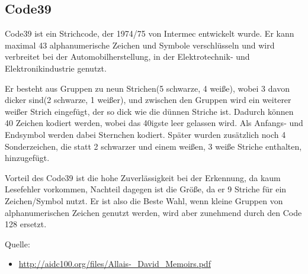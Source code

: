 \subsection*{Code39}
Code39 ist ein Strichcode, der 1974/75 von Intermec entwickelt wurde. Er kann maximal 43 alphanumerische Zeichen und Symbole verschlüsseln und wird verbreitet bei der Automobilherstellung, in der Elektrotechnik- und Elektronikindustrie genutzt.

Er besteht aus Gruppen zu neun Strichen(5 schwarze, 4 weiße), wobei 3 davon dicker sind(2 schwarze, 1 weißer), und zwischen den Gruppen wird ein weiterer weißer Strich eingefügt, der so dick wie die dünnen Striche ist. Dadurch können 40 Zeichen kodiert werden, wobei das 40igste leer gelassen wird. Als Anfangs- und Endsymbol werden dabei Sternchen kodiert. Später wurden zusätzlich noch 4 Sonderzeichen, die statt 2 schwarzer und einem weißen, 3 weiße Striche enthalten, hinzugefügt.

Vorteil des Code39 ist die hohe Zuverlässigkeit bei der Erkennung, da kaum Lesefehler vorkommen, Nachteil dagegen ist die Größe, da er 9 Striche für ein Zeichen/Symbol nutzt. Er ist also die Beste Wahl, wenn kleine Gruppen von alphanumerischen Zeichen genutzt werden, wird aber zunehmend durch den Code 128 ersetzt.

Quelle:
\begin{itemize}
	\item \url{http://aidc100.org/files/Allais-_David_Memoirs.pdf}
\end{itemize}

